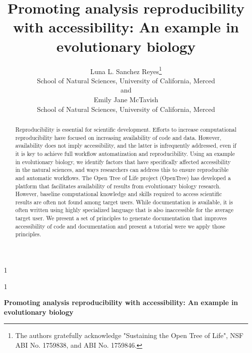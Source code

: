 \documentclass[12pt]{article}
\newcommand{\blind}{1}
\begin{document}
%

\def\spacingset#1{\renewcommand{\baselinestretch}%
{#1}\small\normalsize} \spacingset{1}



\blind
{
  \title{\bf Promoting analysis reproducibility with accessibility: An example in evolutionary biology}
  \author{Luna L. Sanchez Reyes\thanks{
    The authors gratefully acknowledge "Sustaining the Open Tree of Life", NSF ABI No. 1759838, and ABI No. 1759846.}\hspace{.2cm}\\
    School of Natural Sciences, University of California, Merced\\
    and \\
    Emily Jane McTavish \\
    School of Natural Sciences, University of California, Merced}
  \maketitle
} \fi

\blind
{
  \bigskip
  \bigskip
  \bigskip
  \begin{center}
    {\LARGE\bf Promoting analysis reproducibility with accessibility: An example in evolutionary biology}
\end{center}
  \medskip
} \fi

\bigskip
\begin{abstract}
Reproducibility is essential for scientific development. Efforts
to increase computational reproducibility have focused on increasing availability
of code and data. However, availability does not imply accessibility, and the latter
is infrequently addressed, even if it is key to achieve full workflow automatization
and reproducibility. Using an example in evolutionary biology, we identify factors
that have specifically affected accessibility in
the natural sciences, and ways researchers can address this to ensure reproducible
and automatic workflows.
The Open Tree of Life project (OpenTree) has developed a platform that facilitates
availability of results from evolutionary biology research. However, baseline
computational knowledge and skills required to
access scientific results are often not found among target users. While documentation
is available, it is often written using highly specialized language that is also
 inaccessible for the average target user.
We present a set of principles to generate documentation that improves accessibility
of code and documentation and present a tutorial were we apply those principles.



\end{abstract}
\end{document}
